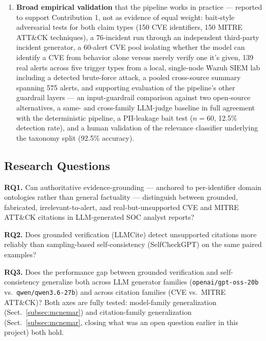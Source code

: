 \documentclass[pdflatex,sn-mathphys-num]{sn-jnl}%
\begin{document}
\begin{enumerate}
   fail grounding, classified into a four-class taxonomy (plus a fifth,
   \texttt{REJECTED}/\texttt{REVOKED}, for formally withdrawn
   identifiers) that generalizes across two distinct claim types.
\item \textbf{Broad empirical validation} that the pipeline works in
   practice --- reported to support Contribution 1, not as evidence of
   equal weight: bait-style adversarial tests for both claim types (150
   CVE identifiers, 150 MITRE ATT\&CK techniques), a 76-incident run
   through an independent third-party incident generator, a 60-alert CVE
   pool isolating whether the model can identify a CVE from behavior
   alone versus merely verify one it's given, 139 real alerts across
   five trigger types from a local, single-node Wazuh SIEM lab including a
   detected brute-force attack, a pooled cross-source summary
   spanning 575 alerts, and supporting evaluation of the pipeline's
   other guardrail layers --- an input-guardrail comparison against two
   open-source alternatives, a same- and cross-family LLM-judge baseline
   in full agreement with the deterministic pipeline, a PII-leakage bait
   test ($n=60$, 12.5\% detection rate), and a human validation of the
   relevance classifier underlying the taxonomy split (92.5\% accuracy).
\end{enumerate}

\subsection{Research Questions}\label{subsec:rqs}

\textbf{RQ1.} Can authoritative evidence-grounding --- anchored to
per-identifier domain ontologies rather than general factuality ---
distinguish between grounded, fabricated, irrelevant-to-alert, and
real-but-unsupported CVE and MITRE ATT\&CK citations in LLM-generated
SOC analyst reports?

\textbf{RQ2.} Does grounded verification (LLMCite) detect unsupported
citations more reliably than sampling-based self-consistency
(SelfCheckGPT) on the same paired examples?

\textbf{RQ3.} Does the performance gap between grounded verification and
self-consistency generalize both across LLM generator families
(\texttt{openai/gpt-oss-20b} vs.\ \texttt{qwen/qwen3.6-27b}) and across
citation families (CVE vs.\ MITRE ATT\&CK)? Both axes are fully tested:
model-family generalization (Sect.~\ref{subsec:mcnemar}) and
citation-family generalization (Sect.~\ref{subsec:mcnemar}, closing what
was an open question earlier in this project) both hold.
\end{document}
